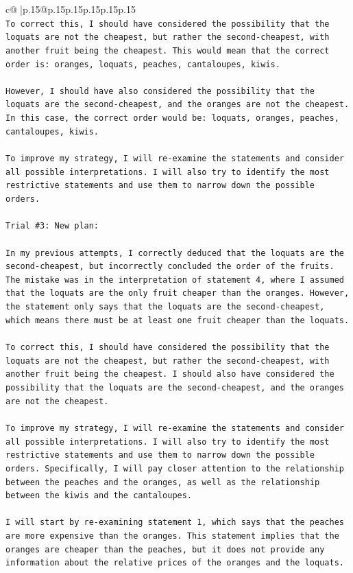 \documentclass{article}
\begin{document}
{\begin{supertabular}{c@{$\;$}|p{.15\linewidth}@{}p{.15\linewidth}p{.15\linewidth}p{.15\linewidth}p{.15\linewidth}p{.15\linewidth}}
{{{\\ 
\texttt{To correct this, I should have considered the possibility that the loquats are not the cheapest, but rather the second{-}cheapest, with another fruit being the cheapest. This would mean that the correct order is: oranges, loquats, peaches, cantaloupes, kiwis.} \\
\\ 
\texttt{However, I should have also considered the possibility that the loquats are the second{-}cheapest, and the oranges are not the cheapest. In this case, the correct order would be: loquats, oranges, peaches, cantaloupes, kiwis.} \\
\\ 
\texttt{To improve my strategy, I will re{-}examine the statements and consider all possible interpretations. I will also try to identify the most restrictive statements and use them to narrow down the possible orders.} \\
\\ 
\texttt{Trial \#3: New plan: } \\
\\ 
\texttt{In my previous attempts, I correctly deduced that the loquats are the second{-}cheapest, but incorrectly concluded the order of the fruits. The mistake was in the interpretation of statement 4, where I assumed that the loquats are the only fruit cheaper than the oranges. However, the statement only says that the loquats are the second{-}cheapest, which means there must be at least one fruit cheaper than the loquats.} \\
\\ 
\texttt{To correct this, I should have considered the possibility that the loquats are not the cheapest, but rather the second{-}cheapest, with another fruit being the cheapest. I should also have considered the possibility that the loquats are the second{-}cheapest, and the oranges are not the cheapest.} \\
\\ 
\texttt{To improve my strategy, I will re{-}examine the statements and consider all possible interpretations. I will also try to identify the most restrictive statements and use them to narrow down the possible orders. Specifically, I will pay closer attention to the relationship between the peaches and the oranges, as well as the relationship between the kiwis and the cantaloupes.} \\
\\ 
\texttt{I will start by re{-}examining statement 1, which says that the peaches are more expensive than the oranges. This statement implies that the oranges are cheaper than the peaches, but it does not provide any information about the relative prices of the oranges and the loquats.} \\
}}}
\end{supertabular}}
\end{document}
